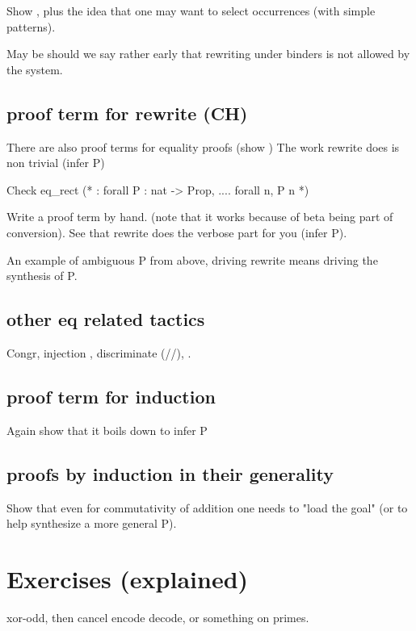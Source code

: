 Show , plus the idea that one may want to select
occurrences (with simple patterns).


May be should we say rather early that rewriting under binders is not
allowed by the system.

\subsection{proof term for rewrite (CH)}

There are also proof terms for equality proofs (show )
The work rewrite does is non trivial (infer P)

\begin{coq}{}
Check eq_rect (* : forall P : nat -> Prop, .... forall n, P n *)
\end{coq}

Write a proof term by hand.
(note that it works because of beta being part of conversion).
See that rewrite does the verbose part for you (infer P).

An example of ambiguous P from above, driving rewrite means driving the
synthesis of P.

\subsection{other eq related tactics}

Congr, injection \C{[= ]}, discriminate (//), \C{->}.


\subsection{proof term for induction}

Again show that it boils down to infer P


\subsection{proofs by induction in their generality}

Show that even for commutativity of addition one needs to
"load the goal" (or to help synthesize a more general P).


\section{Exercises (explained)}

xor-odd, then cancel encode decode, or something on primes.

